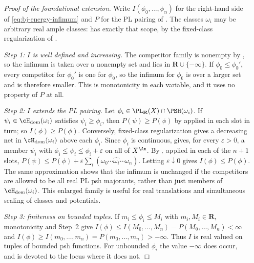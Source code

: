 \begin{proof}[Proof of the foundational extension]
Write $I(\phi_0,\dots,\phi_n)$ for the right-hand side of
\eqref{eq:bj-energy-infimum} and $P$ for the PL pairing of
.  The classes $\omega_i$ may be arbitrary
real ample classes:  has exactly that scope,
by the fixed-class regularization of
.

\emph{Step 1: $I$ is well defined and increasing.}  The competitor family
is nonempty by , so the infimum is
taken over a nonempty set and lies in $\mathbf R\cup\{-\infty\}$.  If
$\phi_0\le\phi_0'$, every competitor for $\phi_0'$ is one for
$\phi_0$, so the infimum for $\phi_0$ is over a larger set and is
therefore smaller.  This is monotonicity in each variable, and it uses no
property of $P$ at all.

\emph{Step 2: $I$ extends the PL pairing.}  Let
$\phi_i\in\PL_{\mathbf R}(X)\cap\PSH(\omega_i)$.  If
$\psi_i\in\cH_{\mathrm{dom}}(\omega_i)$ satisfies $\psi_i\ge\phi_i$,
then $P(\psi)\ge P(\phi)$ by
 applied in each slot in turn; so
$I(\phi)\ge P(\phi)$. Conversely, fixed-class regularization gives
a decreasing net in $\cH_{\mathrm{dom}}(\omega_i)$ above each
$\phi_i$. Since $\phi_i$ is continuous,  gives,
for every $\varepsilon>0$, a member $\psi_i$ with
$\phi_i\le\psi_i\le\phi_i+\varepsilon$ on all of $X^{\An}$. By
, applied in each of the $n+1$ slots,
$P(\psi)\le P(\phi)+\varepsilon\sum_i(\omega_0\cdots\widehat{\omega_i}
\cdots\omega_n)$.  Letting $\varepsilon\downarrow0$ gives
$I(\phi)\le P(\phi)$. The same approximation shows that the infimum
is unchanged if the competitors are allowed to be all real PL psh
majorants, rather than just members of
$\cH_{\mathrm{dom}}(\omega_i)$. This enlarged family is useful for
real translations and simultaneous scaling of classes and potentials.

\emph{Step 3: finiteness on bounded tuples.}  If $m_i\le\phi_i\le M_i$
with $m_i,M_i\in\mathbf R$, monotonicity and Step~2 give
$I(\phi)\le I(M_0,\dots,M_n)=P(M_0,\dots,M_n)<\infty$ and
$I(\phi)\ge I(m_0,\dots,m_n)=P(m_0,\dots,m_n)>-\infty$. Thus
$I$ is real valued on tuples of bounded psh functions.  For unbounded
$\phi_i$ the value $-\infty$ does occur, and
 is devoted to the locus where it does not.


\end{proof}

